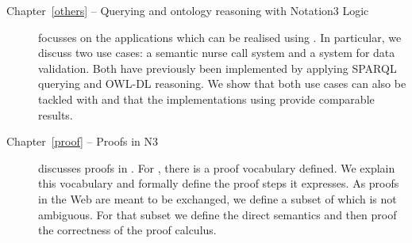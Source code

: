 \begin{description}
\item[Chapter~\ref{others} -- Querying and ontology reasoning with Notation3 Logic]
focusses on the applications which can be realised using \nthreelogic. In particular, we discuss two use cases:
 a semantic nurse call system and a system for data validation. Both have  previously been implemented by 
applying SPARQL querying and OWL-DL reasoning. We show that both use cases can also be tackled with \nthree and that the implementations using \nthree
provide comparable results.
% 
% 
% 


\item[Chapter~\ref{proof} -- Proofs in N3]
discusses proofs in \nthree.
For \nthree, there is a proof vocabulary defined. We explain this vocabulary and formally define the proof steps it expresses. 
As proofs in the Web are meant to be exchanged, we define a subset of \nthree which is not ambiguous. For that subset we define the direct semantics and then proof the 
correctness of the proof calculus.



\end{description}

